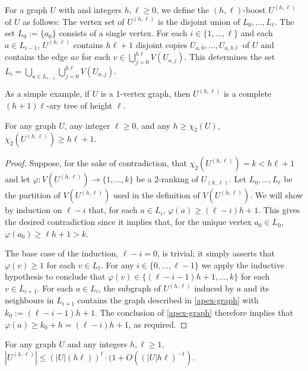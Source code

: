 \documentclass[kpfonts]{patmorin}
\newcommand{\trn}{\chi_2}
\theoremstyle{named}
\begin{document}
For a graph $U$ with and integers $h,\ell\ge 0$, we define the $(h,\ell)$-boost $U^{(h,\ell)}$ of $U$ as follows: The vertex set of $U^{(h,\ell)}$ is the disjoint union of $L_0,\ldots,L_\ell$.  The set $L_0:=\{a_0\}$ consists of a single vertex. For each $i\in\{1,\ldots,\ell\}$ and each $a\in L_{i-1}$, $U^{(h,\ell)}$ contains $h\ell+1$ disjoint copies $U_{a,0},\ldots,U_{a,h\ell}$ of $U$ and contains the edge $av$ for each $v\in\bigcup_{j=0}^{h\ell} V(U_{a,j})$.  This determines the set $L_i=\bigcup_{a\in L_{i-1}}\bigcup_{j=0}^{h\ell} V(U_{a,j})$.

As a simple example, if $U$ is a 1-vertex graph, then $U^{(h,\ell)}$ is a complete $(h+1)\ell$-ary tree of height $\ell$.

\begin{lem}\label{boost}
    For any graph $U$, any integer $\ell\ge 0$, and any $h\ge\trn(U)$, $\trn(U^{(h,\ell)})\ge h\ell +1$.
\end{lem}

\begin{proof}
    Suppose, for the sake of contradiction, that $\trn(U^{(h,\ell)})=k<h\ell+1$ and let $\varphi:V(U^{(h,\ell)})\to\{1,\ldots,k\}$ be a 2-ranking of $U_{(h,\ell)}$.  Let $L_0,\ldots,L_{\ell}$ be the partition of $V(U^{(h,\ell)})$ used in the definition of $V(U^{(h,\ell)})$.
    We will show by induction on $\ell-i$ that, for each $a\in L_{i}$, $\varphi(a)\ge(\ell-i)h+1$. This gives the desired contradiction since it implies that, for the unique vertex $a_0\in L_0$, $\varphi(a_0)\ge \ell h+1 > k$.

    The base case of the induction, $\ell-i=0$, is trivial; it simply asserts that $\varphi(v)\ge 1$ for each $v\in L_\ell$.  For any $i\in\{0,\ldots,\ell-1\}$ we apply the inductive hypothesis to conclude that $\varphi(v)\in\{(\ell-i-1)h+1,\ldots,k\}$ for each $v\in L_{i+1}$.  For each $a\in L_i$, the subgraph of $U^{(h,\ell)}$ induced by $a$ and its neighbours in $L_{i+1}$ contains the graph described in \cref{apex-graph} with $k_0:=(\ell-i-1)h+1$.  The conclusion of \cref{apex-graph} therefore implies that $\varphi(a)\ge k_0+h=(\ell-i)h+1$, as required.
\end{proof}

\begin{lem}\label{boost-size}
    For any graph $U$ and any integers $h,\ell \ge 1$, $|U^{(h,\ell)}| \le (|U|(h\ell))^{\ell}\cdot (1+O((|U|h\ell)^{-1})$.
\end{lem}
\end{document}
